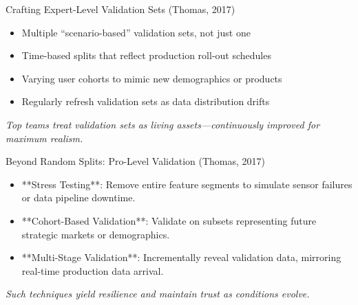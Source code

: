 \documentclass[aspectratio=169]{beamer}
\begin{document}
\begin{frame}{Crafting Expert-Level Validation Sets (Thomas, 2017)}
\begin{itemize}
\item Multiple “scenario-based” validation sets, not just one
\item Time-based splits that reflect production roll-out schedules
\item Varying user cohorts to mimic new demographics or products
\item Regularly refresh validation sets as data distribution drifts
\end{itemize}

\emph{Top teams treat validation sets as living assets—continuously improved for maximum realism.}
\end{frame}

\begin{frame}{Beyond Random Splits: Pro-Level Validation (Thomas, 2017)}
\begin{itemize}
\item **Stress Testing**: Remove entire feature segments to simulate sensor failures or data pipeline downtime.
\item **Cohort-Based Validation**: Validate on subsets representing future strategic markets or demographics.
\item **Multi-Stage Validation**: Incrementally reveal validation data, mirroring real-time production data arrival.
\end{itemize}

\emph{Such techniques yield resilience and maintain trust as conditions evolve.}
\end{frame}
\end{document}
